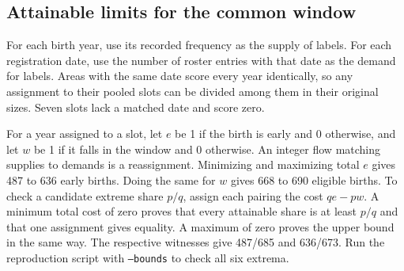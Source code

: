 \documentclass[11pt]{article}
\begin{document}
\begin{appendices}
\section{Attainable limits for the common window}\label{app:bounds}
For each birth year, use its recorded frequency as the supply of labels. For each registration date, use the number of roster entries with that date as the demand for labels. Areas with the same date score every year identically, so any assignment to their pooled slots can be divided among them in their original sizes. Seven slots lack a matched date and score zero.

For a year assigned to a slot, let $e$ be 1 if the birth is early and 0 otherwise, and let $w$ be 1 if it falls in the window and 0 otherwise. An integer flow matching supplies to demands is a reassignment. Minimizing and maximizing total $e$ gives 487 to 636 early births. Doing the same for $w$ gives 668 to 690 eligible births. To check a candidate extreme share $p/q$, assign each pairing the cost $qe-pw$. A minimum total cost of zero proves that every attainable share is at least $p/q$ and that one assignment gives equality. A maximum of zero proves the upper bound in the same way. The respective witnesses give 487/685 and 636/673. Run the reproduction script with \texttt{--bounds} to check all six extrema.
\end{appendices}
\end{document}
